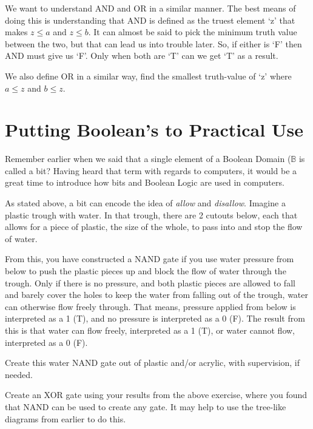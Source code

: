 We want to understand AND and OR in a similar manner. The best means of doing this is understanding that AND is defined as the truest element `z' that makes $z \leq a$ and $z \leq b$. It can almost be said to pick the minimum truth value between the two, but that can lead us into trouble later. So, if either is `F' then AND must give us `F'. Only when both are `T' can we get `T' as a result.

We also define OR in a similar way, find the smallest truth-value of `z' where $a \leq z$ and $b \leq z$.

\section{Putting Boolean's to Practical Use}
Remember earlier when we said that a single element of a Boolean Domain ($\mathbb{B}$ is called a bit? Having heard that term with regards to computers, it would be a great time to introduce how bits and Boolean Logic are used in computers.

As stated above, a bit can encode the idea of \emph{allow} and \emph{disallow}. Imagine a plastic trough with water. In that trough, there are 2 cutouts below, each that allows for a piece of plastic, the size of the whole, to pass into and stop the flow of water. 

From this, you have constructed a NAND gate if you use water pressure from below to push the plastic pieces up and block the flow of water through the trough. Only if there is no pressure, and both plastic pieces are allowed to fall and barely cover the holes to keep the water from falling out of the trough, water can otherwise flow freely through. That means, pressure applied from below is interpreted as a 1 (T), and no pressure is interpreted as a 0 (F). The result from this is that water can flow freely, interpreted as a 1 (T), or water cannot flow, interpreted as a 0 (F).

\begin{exercise}
Create this water NAND gate out of plastic and/or acrylic, with supervision, if needed.
\end{exercise}

\begin{exercise}
Create an XOR gate using your results from the above exercise, where you found that NAND can be used to create any gate. It may help to use the tree-like diagrams from earlier to do this.
\end{exercise}

